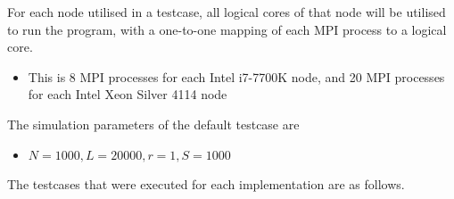 \documentclass[12pt]{article}
\begin{document}
For each node utilised in a testcase, all logical cores of that node will be utilised to run the program, with a one-to-one mapping of each MPI process to a logical core.
\begin{itemize}
    \item This is 8 MPI processes for each Intel i7-7700K node, and 20 MPI processes for each Intel Xeon Silver 4114 node
\end{itemize}

\pagebreak

The simulation parameters of the default testcase are
\begin{itemize}
	\item $N = 1000, L=20000, r=1, S=1000$
\end{itemize}

The testcases that were executed for each implementation are as follows.
\end{document}
